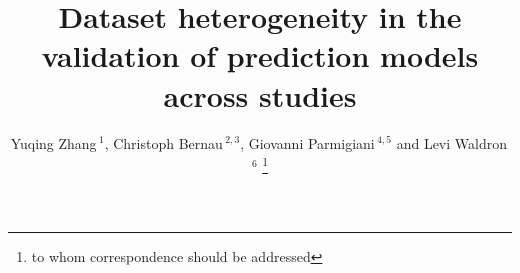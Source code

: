\documentclass{bioinfo}
\begin{document}

\title[Cross-study validation]{Dataset heterogeneity in the validation of prediction models across studies}
\author[Zhang \textit{et~al}]{Yuqing Zhang\,$^{1}$, Christoph Bernau\,$^{2,3}$, Giovanni Parmigiani\,$^{4,5}$ and Levi Waldron\,$^{6}$ \footnote{to whom correspondence should be addressed}}
\address{$^{1}$Boston University Bioinformatics Program, Boston, U.S.A\\
$^{2}$Leibniz Supercomputing Center, Garching, Germany\\
$^{3}$Department for Medical Informatics, Biometry and Epidemiology, Munich, Germany \\
$^{4}$Dana-Farber Cancer Institute, Boston, U.S.A\\
$^{5}$Harvard School of Public Health, Boston, U.S.A\\
$^{6}$School of Urban Public Health at Hunter College, City University of New York, New York, U.S.A}



\maketitle
\end{document}
